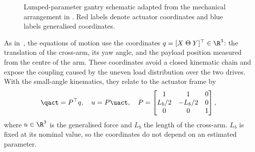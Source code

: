 \begin{figure}[b]
  \centering
  \def\gantryabsorber{0}%
  
  \caption{Lumped-parameter gantry schematic adapted from the mechanical
  arrangement in \cite{garcia2013model}. Red labels denote actuator coordinates
  and blue labels generalised coordinates.}
  \label{fig:gantry_system}
\end{figure}

As in~\cite[Sec.~2.2]{garcia2013model}, the equations of motion use the
coordinates $q=[X\;\Theta\;Y]^\top\in\R^3$: the translation of the cross-arm,
its yaw angle, and the payload position measured from the centre of the arm.
These coordinates avoid a closed kinematic chain and expose the coupling caused
by the uneven load distribution over the two drives.
With the small-angle kinematics, they relate to the actuator frame by
\begin{equation}
  \qact=P^\top q,\quad u=P\uact,\quad
  P=\begin{bmatrix}
    1 & 1 & 0\\
    L_b/2 & -L_b/2 & 0\\
    0 & 0 & 1
  \end{bmatrix},
  \label{eq:Ptransform}
\end{equation}
where $u\in\R^3$ is the generalised force and $L_b$ the length of the
cross-arm.
$L_b$ is fixed at its nominal value, so the coordinates do not depend on an
estimated parameter.

